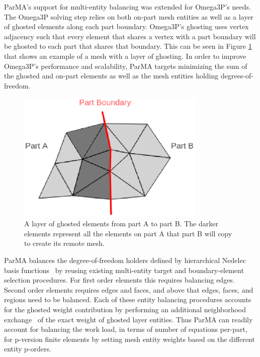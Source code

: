 \documentclass[review,authoryear,12pt]{elsarticle_summary_report}
\begin{document}
ParMA's support for multi-entity balancing was extended for Omega3P's needs.
The Omega3P solving step relies on both on-part mesh entities as well as a layer
of ghosted elements along each part boundary.
Omega3P's ghosting uses vertex adjacency such that every element that shares a
vertex with a part boundary will be ghosted to each part that shares that
boundary.
This can be seen in Figure \ref{fig:ghost3} that shows an example of a mesh with
a layer of ghosting.
In order to improve Omega3P's performance and scalability, ParMA targets
minimizing the sum of the ghosted and on-part elements as well as the mesh
entities holding degrees-of-freedom.

\begin{figure}[ht]
\centering
\includegraphics[width=0.8\textwidth]{ghost.eps} 
\caption{\label{fig:ghost3} A layer of ghosted elements from part A to part B. The darker elements represent all the elements on part A that part B will copy to create its remote mesh.}
\end{figure}

ParMA balances the degree-of-freedom holders defined by 
hierarchical Nedelec basis functions~\cite{ko2010advances,ingelstrom2006new} by
reusing existing multi-entity target and boundary-element selection
procedures.
For first order elements this requires balancing edges.
Second order elements requires edges and faces, and above that edges, faces, and
regions need to be balanced.
Each of these entity balancing procedures accounts for the ghosted weight
contribution by performing an additional neighborhood
exchange~\cite{ibanez2014hybrid} of the exact weight of ghosted layer entities.
Thus ParMA can readily account for balancing the work load, in terms of number
of equations per-part, for p-version finite elements by setting mesh entity
weights based on the different entity p-orders.
\end{document}
